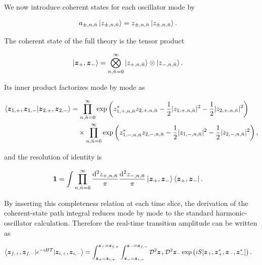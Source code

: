 We now introduce coherent states for each oscillator mode by

\begin{align}
a_{\pm,n,\bar{n}}\left|z_{\pm,n,\bar{n}}\right\rangle & =z_{\pm,n,\bar{n}}\left|z_{\pm,n,\bar{n}}\right\rangle.
\end{align}

The coherent state of the full theory is the tensor product

\begin{align}
\left|\boldsymbol{z}_{+},\boldsymbol{z}_{-}\right\rangle & =\bigotimes ^{\infty}_{n,\bar{n}=0}\left|z_{+,n,\bar{n}}\right\rangle\otimes \left|z_{-,n,\bar{n}}\right\rangle.
\end{align}

Its inner product factorizes mode by mode as

\begin{align}
\left\langle \boldsymbol{z}_{1,+},\boldsymbol{z}_{1,-}|\boldsymbol{z}_{2,+},\boldsymbol{z}_{2,-} \right\rangle & =\prod ^{\infty}_{n,\bar{n}=0}\exp\left(z^{*}_{1,+,n,\bar{n}}z_{2,+,n,\bar{n}}-\frac{1}{2}|z_{1,+,n,\bar{n}}|^{2}-\frac{1}{2}|z_{2,+,n,\bar{n}}|^{2}\right) \\
& \quad \times \prod ^{\infty}_{n,\bar{n}=0}\exp\left(z^{*}_{1,-,n,\bar{n}}z_{2,-,n,\bar{n}}-\frac{1}{2}|z_{1,-,n,\bar{n}}|^{2}-\frac{1}{2}|z_{2,-,n,\bar{n}}|^{2}\right),
\end{align}

and the resolution of identity is

\begin{align}
\mathbf{1} & =\int \prod ^{\infty}_{n,\bar{n}=0}\frac{\mathrm{d}^{2}z_{+,n,\bar{n}}}{\pi}\frac{\mathrm{d}^{2}z_{-,n,\bar{n}}}{\pi}\left|\boldsymbol{z}_{+},\boldsymbol{z}_{-}\right\rangle\left\langle\boldsymbol{z}_{+},\boldsymbol{z}_{-}\right|.
\end{align}

By inserting this completeness relation at each time slice, the derivation of the coherent-state path integral reduces mode by mode to the standard harmonic-oscillator calculation. Therefore the real-time transition amplitude can be written as

\begin{align}
\left\langle \boldsymbol{z}_{f,+},\boldsymbol{z}_{f,-}|e^{-iHT}|\boldsymbol{z}_{i,+},\boldsymbol{z}_{i,-} \right\rangle & =\int _{\boldsymbol{z}_{+}=\boldsymbol{z}_{i,+}}^{\boldsymbol{z}_{+}=\boldsymbol{z}_{f,+}}\int _{\boldsymbol{z}_{-}=\boldsymbol{z}_{i,-}}^{\boldsymbol{z}_{-}=\boldsymbol{z}_{f,-}} \mathcal{D}^{2}\boldsymbol{z}_{+}\mathcal{D}^{2}\boldsymbol{z}_{-}\exp\left(iS[\boldsymbol{z}_{+},\boldsymbol{z}^{*}_{+},\boldsymbol{z}_{-},\boldsymbol{z}^{*}_{-}]\right).
\end{align}

